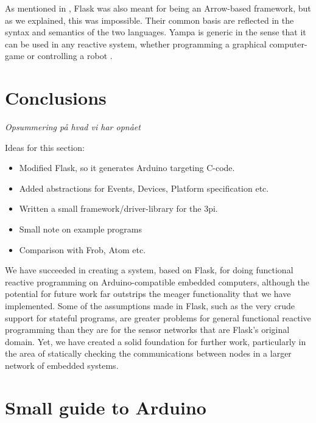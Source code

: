 \documentclass[a4paper, oneside, final]{memoir}
\let\Fref\undefined
\begin{document}
As mentioned in \Fref[plain]{chap:Flask}, Flask was also meant for
being an Arrow-based framework, but as we explained, this was
impossible. Their common basis are reflected in the syntax and
semantics of the two languages. Yampa is generic in the sense that it
can be used in any reactive system, whether programming a graphical
computer-game \cite{Courtney2003b} or controlling a robot
\cite{arrowsrobotsfrp02}.


\chapter{Conclusions}
\textit{Opsummering på hvad vi har opnået}

Ideas for this section:
\begin{itemize}
\item Modified Flask, so it generates Arduino targeting C-code.
\item Added abstractions for Events, Devices, Platform specification etc.
\item Written a small framework/driver-library for the 3pi.
\item Small note on example programs
\item Comparison with Frob, Atom etc.
\end{itemize}

We have succeeded in creating a system, based on Flask, for doing
functional reactive programming on Arduino-compatible embedded
computers, although the potential for future work far outstrips the
meager functionality that we have implemented.  Some of the
assumptions made in Flask, such as the very crude support for stateful
programs, are greater problems for general functional reactive
programming than they are for the sensor networks that are Flask's
original domain.  Yet, we have created a solid foundation for further
work, particularly in the area of statically checking the
communications between nodes in a larger network of embedded systems.




\appendix

\chapter{Small guide to Arduino}
\end{document}
